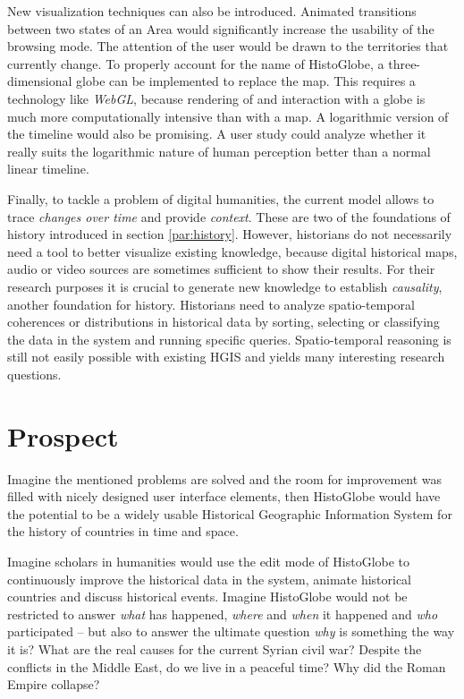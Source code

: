New visualization techniques can also be introduced. Animated transitions between two states of an Area would significantly increase the usability of the browsing mode. The attention of the user would be drawn to the territories that currently change. To properly account for the name of HistoGlobe, a three-dimensional globe can be implemented to replace the map. This requires a technology like \emph{WebGL}, because rendering of and interaction with a globe is much more computationally intensive than with a map. A logarithmic version of the timeline would also be promising. A user study could analyze whether it really suits the logarithmic nature of human perception better than a normal linear timeline.

Finally, to tackle a problem of digital humanities, the current model allows to trace \emph{changes over time} and provide \emph{context}. These are two of the foundations of history introduced in section \ref{par:history}. However, historians do not necessarily need a tool to better visualize existing knowledge, because digital historical maps, audio or video sources are sometimes sufficient to show their results. For their research purposes it is crucial to generate new knowledge to establish \emph{causality}, another foundation for history. Historians need to analyze spatio-temporal coherences or distributions in historical data by sorting, selecting or classifying the data in the system and running specific queries. Spatio-temporal reasoning is still not easily possible with existing HGIS and yields many interesting research questions.


\newpage
\section{Prospect} %
\label{sec:prospect}

Imagine the mentioned problems are solved and the room for improvement was filled with nicely designed user interface elements, then HistoGlobe would have the potential to be a widely usable Historical Geographic Information System for the history of countries in time and space.

Imagine scholars in humanities would use the edit mode of HistoGlobe to continuously improve the historical data in the system, animate historical countries and discuss historical events. Imagine HistoGlobe would not be restricted to answer \emph{what} has happened, \emph{where} and \emph{when} it happened and \emph{who} participated -- but also to answer the ultimate question \emph{why} is something the way it is?
What are the real causes for the current Syrian civil war?
Despite the conflicts in the Middle East, do we live in a peaceful time?
Why did the Roman Empire collapse?


